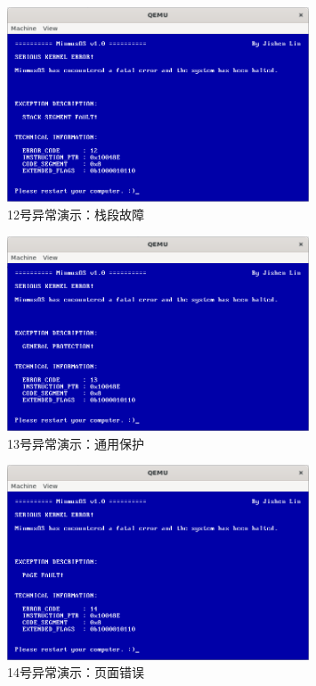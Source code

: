 \begin{figure}[htbp]
    \centering
    \includegraphics[width=0.8\textwidth]{figures/Exception12Presentation.png}
    \caption{12号异常演示：栈段故障}
\end{figure}

\begin{figure}[htbp]
    \centering
    \includegraphics[width=0.8\textwidth]{figures/Exception13Presentation.png}
    \caption{13号异常演示：通用保护}
\end{figure}

\begin{figure}[htbp]
    \centering
    \includegraphics[width=0.8\textwidth]{figures/Exception14Presentation.png}
    \caption{14号异常演示：页面错误}
\end{figure}

